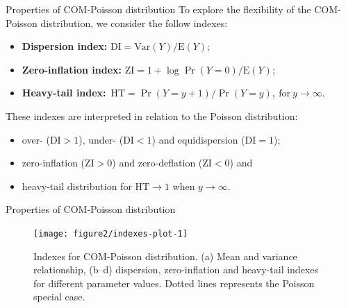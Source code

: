 \documentclass[11pt]{beamer}\usepackage[]{graphicx}\usepackage[]{color}
\begin{document}
\begin{frame}{Properties of COM-Poisson distribution}
  To explore the flexibility of the COM-Poisson distribution, we
  consider the follow indexes:
  \begin{itemize} \small
  \item \textbf{Dispersion index:}\quad\:\;
    $\text{DI} = \text{Var}(Y)/\text{E}(Y);$\\
  \item \textbf{Zero-inflation index:}\;
    $\text{ZI} = 1 + \log \Pr(Y = 0)/\text{E}(Y);$
  \item \textbf{Heavy-tail index:}\quad\:\;\,
    $\text{HT} = \Pr(Y=y+1)/\Pr(Y=y),\:
    \text{for}\: y \to \infty.$\\
  \end{itemize}
  \vspace{0.4cm}

  These indexes are interpreted in relation to the Poisson distribution:
  \begin{itemize}
  \item
    over- ($\text{DI} > 1$), under- ($\text{DI} < 1$) and
    equidispersion ($\text{DI} = 1$);\\
  \item
    zero-inflation ($\text{ZI} > 0$) and zero-deflation ($\text{ZI} <
    0$) and
  \item
    heavy-tail distribution for $\text{HT} \to 1$ when $y \to
    \infty$.
  \end{itemize}
\end{frame}

\begin{frame}{Properties of COM-Poisson distribution}

\begin{figure}[!htb]

{\centering \texttt{[image: figure2/indexes-plot-1]} 

}

\caption[Indexes for COM-Poisson distribution]{Indexes for COM-Poisson distribution. (a) Mean and variance relationship, (b--d) dispersion, zero-inflation and heavy-tail indexes for different parameter values. Dotted lines represents the Poisson special case.}\label{fig:indexes-plot}
\end{figure}



\end{frame}
\end{document}
